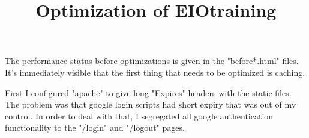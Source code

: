 \documentclass{article}
\begin{document}
\title{Optimization of EIOtraining}
\maketitle

The performance status before optimizations is given in the "before*.html" files. It's immediately visible that the first thing that needs to be optimized is caching.

First I configured "apache" to give long "Expires" headers with the static files. The problem was that google login scripts had short expiry that was out of my control. In order to deal with that, I segregated all google authentication functionality to the "/login" and "/logout" pages.
\end{document}
